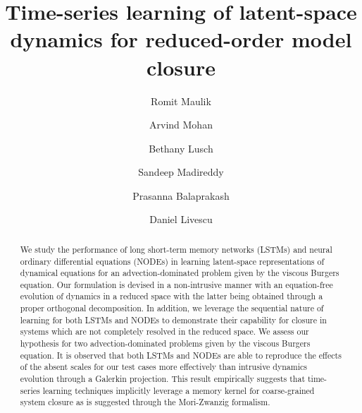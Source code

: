 \documentclass[preprint,12pt]{elsarticle}
\begin{document}
\begin{frontmatter}


\title{Time-series learning of latent-space dynamics for reduced-order model closure}


\author[label1]{Romit Maulik}
\author[label2]{Arvind Mohan}
\author[label1]{Bethany Lusch}
\author[label3]{Sandeep Madireddy}
\author[label1,label3]{Prasanna Balaprakash}
\author[label2]{Daniel Livescu}

\address[label1]{Argonne Leadership Computing Facility, Argonne National Laboratory, Lemont, IL 60439, USA}
\address[label2]{Center for Nonlinear Studies/CCS-2 Division, Los Alamos National Laboratory, Los Alamos, NM 87545, USA}
\address[label3]{Mathematics and Computer Science Division, Argonne National Laboratory, Lemont, IL 60439, USA}



\begin{abstract}
We study the performance of long short-term memory networks (LSTMs) and neural ordinary differential equations (NODEs) in learning latent-space representations of dynamical equations for an advection-dominated problem given by the viscous Burgers equation. Our formulation is devised in a non-intrusive manner with an equation-free evolution of dynamics in a reduced space with the latter being obtained through a proper orthogonal decomposition. In addition, we leverage the sequential nature of learning for both LSTMs and NODEs to demonstrate their capability for closure in systems which are not completely resolved in the reduced space. We assess our hypothesis for two advection-dominated problems given by the viscous Burgers equation. It is observed that both LSTMs and NODEs are able to reproduce the effects of the absent scales for our test cases more effectively than intrusive dynamics evolution through a Galerkin projection. This result empirically suggests that time-series learning techniques implicitly leverage a memory kernel for coarse-grained system closure as is suggested through the Mori-Zwanzig formalism.
\end{abstract}


\end{frontmatter}
\end{document}
